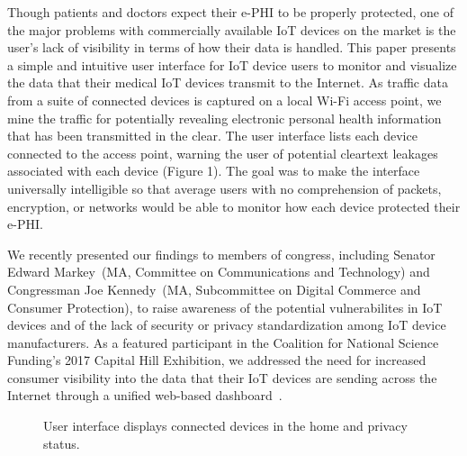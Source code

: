Though patients and doctors expect their e-PHI to be properly protected, one
of the major problems with commercially available IoT devices on the market is
the user's lack of visibility in terms of how their data is handled. This
paper presents a simple and intuitive user interface for IoT device users to
monitor and visualize the data that their medical IoT devices transmit to the
Internet. As traffic data from a suite of connected devices is captured on a
local Wi-Fi access point, we mine the traffic for potentially revealing
electronic personal health information that has been transmitted in the clear.
The user interface lists each device connected to the access point, warning
the user of potential cleartext leakages associated with each device (Figure
1). The goal was to make the interface universally intelligible so that
average users with no comprehension of packets, encryption, or networks would
be able to monitor how each device protected their e-PHI.

We recently presented our findings to members of congress, including Senator
Edward Markey~(MA, Committee on Communications and Technology) and Congressman Joe Kennedy~(MA, Subcommittee on Digital Commerce and Consumer Protection), to raise awareness of the
potential vulnerabilites in IoT devices and of the lack of security or privacy
standardization among IoT device manufacturers. As a featured
participant in the Coalition for National Science Funding's 2017 Capital Hill Exhibition,
we addressed the need for increased consumer visibility into the data that their
IoT devices are sending across the Internet through a unified web-based dashboard~\cite{cra}.
\begin{figure}[t]
  \centering
  \caption{User interface displays connected devices in the home and privacy status.}
  \label{fig:dashboard}
\end{figure}

